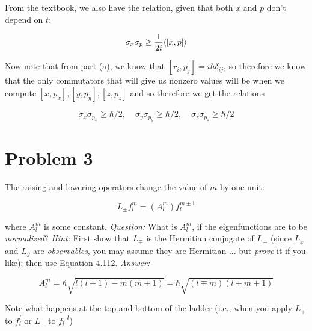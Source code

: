 \documentclass[10pt]{article}
\begin{document}
\begin{enumerate}[(a)]
        \begin{solution}
            From the textbook, we also have the relation, given that both $x$ and $p$ don't depend on $t$: 

            \[ \sigma_x\sigma_p \ge \frac{1}{2i}\langle [x, p] \rangle\]

            Now note that from part (a), we know that $[r_i, p_j] = i\hbar \delta_{ij}$, so therefore we know that the only commutators that will give us nonzero values will be when we compute $[x, p_x], [y, p_y], [z, p_z]$ and so therefore we get the relations 

            \[ \sigma_x \sigma_{p_x} \ge \hbar/2, \phantom{aa} \sigma_y \sigma_{p_y} \ge \hbar/2, \phantom{aa} \sigma_z \sigma_{p_z} \ge \hbar/2\] 
        \end{solution}
    \end{enumerate}

    \pagebreak
    \section*{Problem 3}

    The raising and lowering operators change the value of $m$ by one unit:

    \[ L_{\pm} f_l^m = (A_l^m)f_l^{m \pm 1}\] 

    where $A_l^m$ is some constant. \textit{Question:} What is $A_l^m$, if the eigenfunctions are to be \textit{normalized}? \textit{Hint:} First show that $L_\mp$ is the Hermitian conjugate of $L_\pm$ (since $L_x$ and $L_y$ are \textit{observables}, you may assume they are Hermitian ... but \textit{prove} it if you like); then use Equation 4.112. \textit{Answer:}

    \[ A_l^m = \hbar \sqrt{l(l+1) -m (m \pm 1)} = \hbar \sqrt{(l \mp m)(l \pm m  + 1)}\]

    Note what happens at the top and bottom of the ladder (i.e., when you apply $L_+$ to $f_l^l$ or $L_-$ to $f_l^{-l}$)
\end{document}
